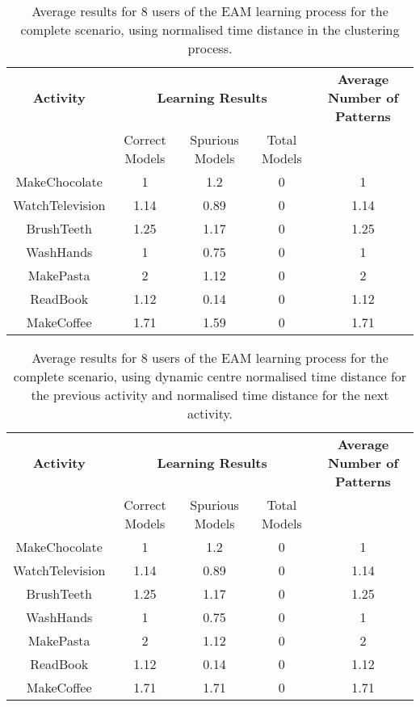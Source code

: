 \begin{table}[htbp]\scriptsize
  \begin{center}
        \begin{tabular}{ccccc}
            \hline            
            \textbf{Activity} & \multicolumn{3}{c}{\textbf{Learning Results}} & \textbf{Average Number of Patterns} \\
             & Correct Models & Spurious Models & Total Models & \\
            \hline
            MakeChocolate   & 1    & 1.2   & 0 & 1 \\
	    WatchTelevision & 1.14 & 0.89  & 0 & 1.14 \\
	    BrushTeeth      & 1.25 & 1.17  & 0 & 1.25 \\
	    WashHands       & 1    & 0.75  & 0 & 1 \\
	    MakePasta       & 2    & 1.12  & 0 & 2 \\
	    ReadBook        & 1.12 & 0.14  & 0 & 1.12 \\
	    MakeCoffee      & 1.71 & 1.59  & 0 & 1.71 \\
            \hline
        \end{tabular}                
        \caption{Average results for 8 users of the EAM learning process for the complete scenario, using normalised time distance in the clustering process.}
        \label{tab-rp-comp-t1}
    \end{center}
\end{table}



\begin{table}[htbp]\scriptsize
  \begin{center}
        \begin{tabular}{ccccc}
            \hline            
            \textbf{Activity} & \multicolumn{3}{c}{\textbf{Learning Results}} & \textbf{Average Number of Patterns} \\
             & Correct Models & Spurious Models & Total Models & \\
            \hline
            MakeChocolate   & 1    & 1.2   & 0 & 1 \\
	    WatchTelevision & 1.14 & 0.89  & 0 & 1.14 \\
	    BrushTeeth      & 1.25 & 1.17  & 0 & 1.25 \\
	    WashHands       & 1    & 0.75  & 0 & 1 \\
	    MakePasta       & 2    & 1.12  & 0 & 2 \\
	    ReadBook        & 1.12 & 0.14  & 0 & 1.12 \\
	    MakeCoffee      & 1.71 & 1.71   & 0 & 1.71 \\
            \hline
        \end{tabular}                
        \caption{Average results for 8 users of the EAM learning process for the complete scenario, using dynamic centre normalised time distance for the previous activity and normalised time distance for the next activity.}
        \label{tab-rp-comp-t2}
    \end{center}
\end{table}

